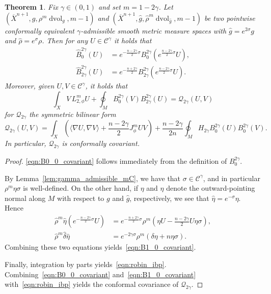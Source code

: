 \documentclass{amsart}
\newtheorem{thm}{Theorem}[section]
\theoremstyle{definition}
\theoremstyle{remark}
\numberwithin{equation}{section}
\begin{document}
\begin{thm}
 \label{thm:robin}
 Fix $\gamma\in(0,1)$ and set $m=1-2\gamma$.  Let $({\overline{X}}^{n+1},g,\rho^m\operatorname{dvol}_g,m-1)$ and $({\overline{X}}^{n+1},{\widehat{g}},{\widehat{\rho}}^m\operatorname{dvol}_{\widehat{g}},m-1)$ be two pointwise conformally equivalent $\gamma$-admissible smooth metric measure spaces with ${\widehat{g}}=e^{2\sigma}g$ and ${\widehat{\rho}}=e^\sigma\rho$.  Then for any $U\in{\mathcal{C}}^\gamma$ it holds that
 \begin{align}
  \label{eqn:B0_0_covariant} {\widehat{B}}_{0}^{2\gamma}(U) & = e^{-\frac{n-2\gamma}{2}\sigma}B_{0}^{2\gamma}\left(e^{\frac{n-2\gamma}{2}\sigma} U\right), \\
  \label{eqn:B1_0_covariant} {\widehat{B}}_{2\gamma}^{2\gamma}\left(U\right) & = e^{-\frac{n+2\gamma}{2}} B_{2\gamma}^{2\gamma}\left( e^{\frac{n-2\gamma}{2}\sigma}U\right) .
 \end{align}
 Moreover, given $U,V\in{\mathcal{C}}^\gamma$, it holds that
 \begin{equation}
  \label{eqn:robin_ibp}
  \int_X V\,L_{2,\phi}^mU + \oint_M B_{0}^{2\gamma}(V)B_{2\gamma}^{2\gamma}(U) = {\mathcal{Q}}_{2\gamma}(U,V)
 \end{equation}
 for ${\mathcal{Q}}_{2\gamma}$ the symmetric bilinear form
 \[ {\mathcal{Q}}_{2\gamma}(U,V) = \int_X \left({\langle}\nabla U,\nabla V{\rangle} + \frac{n-2\gamma}{2}J_\phi^mUV\right) + \frac{n-2\gamma}{2n}\oint_M H_{2\gamma}B_0^{2\gamma}(U)B_0^{2\gamma}(V) . \]
 In particular, ${\mathcal{Q}}_{2\gamma}$ is conformally covariant.
\end{thm}

\begin{proof}
 \eqref{eqn:B0_0_covariant} follows immediately from the definition of $B_{0}^{2\gamma}$.

 By Lemma~\ref{lem:gamma_admissible_mC}, we have that $\sigma\in{\mathcal{C}}^\gamma$, and in particular $\rho^m\eta\sigma$ is well-defined.  On the other hand, if $\eta$ and ${\widehat{\eta}}$ denote the outward-pointing normal along $M$ with respect to $g$ and ${\widehat{g}}$, respectively, we see that ${\widehat{\eta}}=e^{-\sigma}\eta$.  Hence
 \begin{align*}
  {\widehat{\rho}}^m{\widehat{\eta}}\left(e^{-\frac{n-2\gamma}{2}\sigma}U\right) & = e^{-\frac{n+2\gamma}{2}\sigma}\rho^m\left(\eta U - \frac{n-2\gamma}{2}U\eta\sigma\right), \\
  {\widehat{\rho}}^m{\widehat{\delta}}{\widehat{\eta}} & = e^{-2\gamma\sigma}\rho^m\left(\delta\eta + n\eta\sigma\right) .
 \end{align*}
 Combining these two equations yields~\eqref{eqn:B1_0_covariant}.

 Finally, integration by parts yields~\eqref{eqn:robin_ibp}.  Combining~\eqref{eqn:B0_0_covariant} and~\eqref{eqn:B1_0_covariant} with~\eqref{eqn:robin_ibp} yields the conformal covariance of ${\mathcal{Q}}_{2\gamma}$.
\end{proof}
\end{document}
